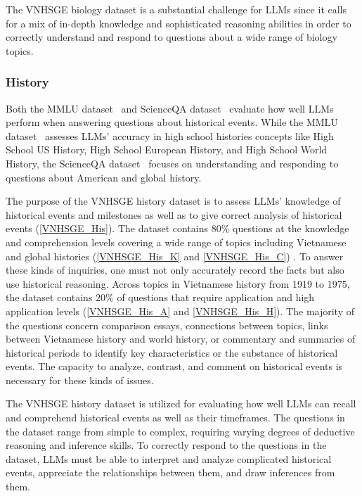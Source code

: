 \documentclass{article}
\begin{document}
{	The VNHSGE biology dataset is a substantial challenge for LLMs since it calls for a mix of in-depth knowledge and sophisticated reasoning abilities in order to correctly understand and respond to questions about a wide range of biology topics.
	
	\subsubsection{History}
	
	Both the MMLU dataset~\cite{hendrycks2020measuring} and ScienceQA dataset~\cite{lu2022learn} evaluate how well LLMs perform when answering questions about historical events. While the MMLU dataset~\cite{hendrycks2020measuring} assesses LLMs' accuracy in high school histories concepts like High School US History, High School European History, and High School World History, the ScienceQA dataset~\cite{lu2022learn} focuses on understanding and responding to questions about American and global history.
	
	The purpose of the VNHSGE history dataset is to assess LLMs' knowledge of historical events and milestones as well as to give correct analysis of historical events (\ref{VNHSGE_His}). The dataset contains $80\%$ questions at the knowledge and comprehension levels covering a wide range of topics including Vietnamese and global histories (\ref{VNHSGE_His_K} and \ref{VNHSGE_His_C}) . To answer these kinds of inquiries, one must not only accurately record the facts but also use historical reasoning. Across topics in Vietnamese history from 1919 to 1975, the dataset contains $20\%$ of questions that require application and high application levels (\ref{VNHSGE_His_A} and \ref{VNHSGE_His_H}). The majority of the questions concern comparison essays, connections between topics, links between Vietnamese history and world history, or commentary and summaries of historical periods to identify key characteristics or the substance of historical events. The capacity to analyze, contrast, and comment on historical events is necessary for these kinds of issues.
	
	The VNHSGE history dataset is utilized for evaluating how well LLMs can recall and comprehend historical events as well as their timeframes. The questions in the dataset range from simple to complex, requiring varying degrees of deductive reasoning and inference skills. To correctly respond to the questions in the dataset, LLMs must be able to interpret and analyze complicated historical events, appreciate the relationships between them, and draw inferences from them.
	
}
\end{document}
